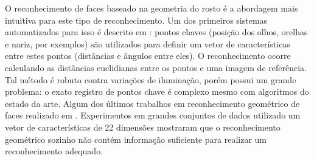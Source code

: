 O reconhecimento de faces baseado na geometria do rosto é a abordagem mais intuitiva para este tipo de reconhecimento. Um dos primeiros sistemas automatizados para isso é descrito em \cite{kanade1973picture}: pontos chaves (posição dos olhos, orelhas e nariz, por exemplos) são utilizados para definir um vetor de características entre estes pontos (distâncias e ângulos entre eles). O reconhecimento ocorre calculando as distâncias euclidianas entre os pontos e uma imagem de referência. Tal método é robuto contra variações de iluminação, porém possui um grande problema: o exato registro de pontos chave é complexo mesmo com algoritmos do estado da arte. Algum dos últimos trabalhos em reconhecimento geométrico de faces realizado em \cite{brunelli1992face}. Experimentos em grandes conjuntos de dados utilizado um vetor de características de 22 dimensões mostraram que o reconhecimento geométrico sozinho não contém informação suficiente para realizar um reconhecimento adequado.

